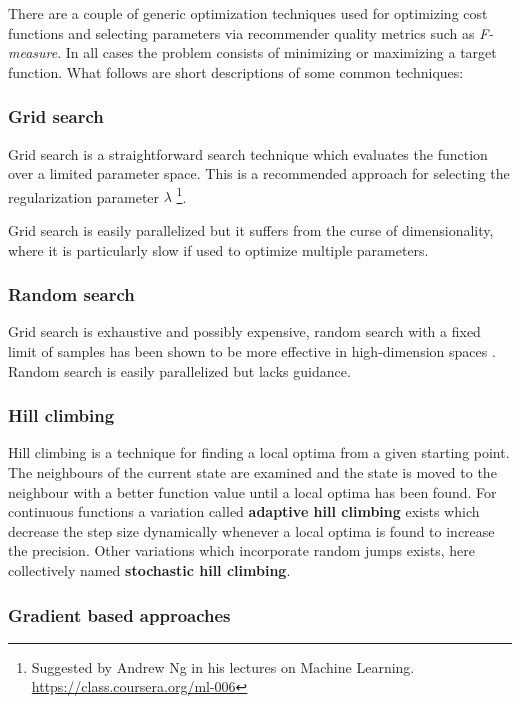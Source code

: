 There are a couple of generic optimization techniques used for optimizing cost functions and selecting parameters via recommender quality metrics such as \textit{F-measure}. In all cases the problem consists of minimizing or maximizing a target function. What follows are short descriptions of some common techniques:


\subsubsection{Grid search}

Grid search is a straightforward search technique which evaluates the function over a limited parameter space. This is a recommended approach for selecting the regularization parameter $\lambda$
\footnote{Suggested by Andrew Ng in his lectures on Machine Learning. \url{https://class.coursera.org/ml-006}}.

Grid search is easily parallelized but it suffers from the curse of dimensionality, where it is particularly slow if used to optimize multiple parameters.


\subsubsection{Random search}

Grid search is exhaustive and possibly expensive, random search with a fixed limit of samples has been shown to be more effective in high-dimension spaces \citep{bergstra2012random}. Random search is easily parallelized but lacks guidance.


\subsubsection{Hill climbing}

Hill climbing is a technique for finding a local optima from a given starting point. The neighbours of the current state are examined and the state is moved to the neighbour with a better function value until a local optima has been found. For continuous functions a variation called \textbf{adaptive hill climbing} exists which decrease the step size dynamically whenever a local optima is found to increase the precision. Other variations which incorporate random jumps exists, here collectively named \textbf{stochastic hill climbing}. \citep{norvigAI}


\subsubsection{Gradient based approaches}

